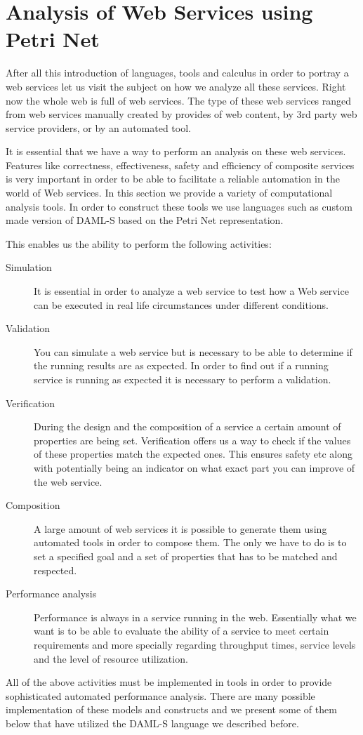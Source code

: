 \section*{Analysis of Web Services using Petri Net}
After all this introduction of languages, tools and calculus in order to portray a web services let us visit the subject on how we analyze all these services.
Right now the whole web is full of web services. The type of these web services ranged from web services manually created by provides of web content, by 3rd party web service providers, or by an automated tool.

It is essential that we have a way to perform an analysis on these web services. Features like correctness, effectiveness, safety and efficiency of composite services is very important in order to be able to facilitate a reliable automation in the world of Web services. In this section we provide a variety of computational analysis tools. In order to construct these tools we use languages such as custom made version of DAML-S based on the Petri Net representation.

This enables us the ability to perform the following activities:

\begin{description}
    \item[Simulation] It is essential in order to analyze a web service to test how a Web service can be executed in real life circumstances  under different conditions.
    \item[Validation] You can simulate a web service but is necessary to be able to determine if the running results are as expected. In order to find out if a running service is running as expected it is necessary to perform a validation.
    \item[Verification] During the design and the composition of a service a certain amount of properties are being set. Verification offers us a way to check if the values of these properties match the expected ones. This ensures safety etc along with potentially being an indicator on what exact part you can improve of the web service.
    \item[Composition] A large amount of web services it is possible to generate them using automated tools in order to compose them. The only we have to do is to set a specified goal and a set of properties that has to be matched and respected.
    \item[Performance analysis] Performance is always in a service running in the web. Essentially what we want is to be able to evaluate the ability of a service to meet certain requirements and more specially regarding throughput times, service levels and the level of resource utilization.
\end{description}

All of the above activities must be implemented in tools in order to provide sophisticated automated performance analysis. There are many possible implementation of these models and constructs and we present some of them below that have utilized the DAML-S language we described before.